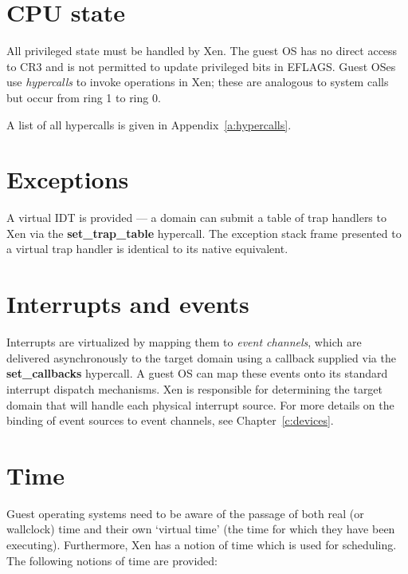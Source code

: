 \documentclass[11pt,twoside,final,openright]{report}
\begin{document}
\section{CPU state}

All privileged state must be handled by Xen.  The guest OS has no
direct access to CR3 and is not permitted to update privileged bits in
EFLAGS. Guest OSes use \emph{hypercalls} to invoke operations in Xen;
these are analogous to system calls but occur from ring 1 to ring 0.

A list of all hypercalls is given in Appendix~\ref{a:hypercalls}.


\section{Exceptions}

A virtual IDT is provided --- a domain can submit a table of trap
handlers to Xen via the {\bf set\_trap\_table} hypercall.  The
exception stack frame presented to a virtual trap handler is identical
to its native equivalent.


\section{Interrupts and events}

Interrupts are virtualized by mapping them to \emph{event channels},
which are delivered asynchronously to the target domain using a callback
supplied via the {\bf set\_callbacks} hypercall.  A guest OS can map
these events onto its standard interrupt dispatch mechanisms.  Xen is
responsible for determining the target domain that will handle each
physical interrupt source. For more details on the binding of event
sources to event channels, see Chapter~\ref{c:devices}.


\section{Time}

Guest operating systems need to be aware of the passage of both real
(or wallclock) time and their own `virtual time' (the time for which
they have been executing). Furthermore, Xen has a notion of time which
is used for scheduling. The following notions of time are provided:
\end{document}

